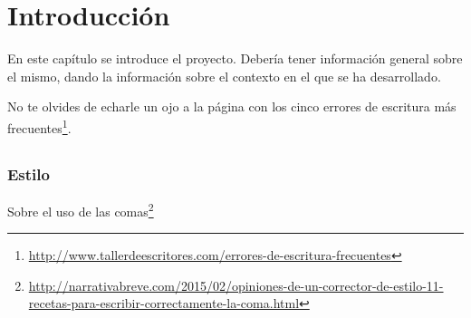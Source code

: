 \documentclass[a4paper, 12pt]{book}
\begin{document}


\tableofcontents 
\cleardoublepage
\listoffigures %



\cleardoublepage
\chapter{Introducción}
\label{sec:intro} %

En este capítulo se introduce el proyecto. Debería tener información general sobre 
el mismo, dando la información sobre el contexto en el que se ha desarrollado.

No te olvides de echarle un ojo a la página con los cinco errores de escritura más frecuentes\footnote{\url{http://www.tallerdeescritores.com/errores-de-escritura-frecuentes}}.

\section{}
\label{sec:}

\subsection{Estilo}
\label{subsec:estilo}

Sobre el uso de las comas\footnote{\url{http://narrativabreve.com/2015/02/opiniones-de-un-corrector-de-estilo-11-recetas-para-escribir-correctamente-la-coma.html}}
\end{document}
